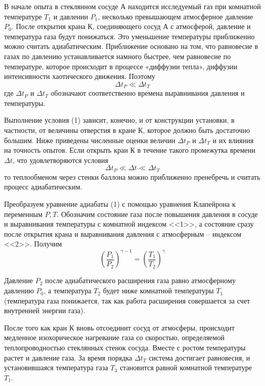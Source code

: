 \documentclass[a4paper,12pt]{article}
\theoremstyle{plain} %
\theoremstyle{definition} %
\theoremstyle{remark} %
\begin{document}
В начале опыта в стеклянном сосуде $\text{А}$ находится исследуемый газ при комнатной температуре $T_1$ и давлении $P_1$, несколько превышающем атмосферное давление $P_0$. После открытия крана $\text{К}$, соединяющего сосуд $\text{А}$ с атмосферой, давление и температура газа будут понижаться. Это уменьшение температуры приближенно можно считать адиабатическим. Приближение основано на том, что равновесие в газах по давлению устанавливается намного быстрее, чем равновесие по температуре, которое происходит в процессе «диффузии тепла», диффузии интенсивности хаотического движения. Поэтому
\begin{equation}
\Delta t_P \ll \Delta t_T
\end{equation}
где $\Delta t_P$ и $\Delta t_T$ обозначают соответственно времена выравнивания давления и температуры.

Выполнение условия (1) зависит, конечно, и от конструкции установки, в частности, от величины отверстия в кране $\text{К}$, которое должно быть достаточно большим. Ниже приведены численные оценки величин $\Delta t_P$ и $\Delta t_T$ и их влияния на точность опытов. Если открыть кран $\text{К}$ в течение такого промежутка времени $\Delta t$, что удовлетворяются условия
\begin{equation}
\Delta t_P \ll \Delta t \ll \Delta t_T
\end{equation}
то теплообменом через стенки баллона можно приближенно пренебречь и считать процесс адиабатическим.

Преобразуем уравнение адиабаты (1) с помощью уравнения Клапейрона к переменным $P, T$. Обозначим состояние газа после повышения давления в сосуде и выравнивания температуры с комнатной индексом <<1>>, а состояние сразу после открытия крана и выравнивания давления с атмосферным -- индексом <<2>>. Получим
\begin{equation}
\left( \frac{P_1}{P_2} \right)^{\gamma - 1} = \left( \frac{T_1}{T_2}\right)^\gamma
\end{equation}

Давление $P_2$ после адиабатического расширения газа равно атмосферному давлению $P_0$, а температура $T_2$ будет ниже комнатной температуры $T_1$ (температура газа понижается, так как работа расширения совершается за счет внутренней энергии газа).

После того как кран $\text{К}$ вновь отсоединит сосуд от атмосферы, происходит медленное изохорическое нагревание газа со скоростью, определяемой теплопроводностью стеклянных стенок сосуда. Вместе с ростом температуры растет и давление газа. За время порядка $\Delta t_T$ система достигает равновесия, и установившаяся температура газа $T_3$ становится равной комнатной температуре $T_1$.
\end{document}
